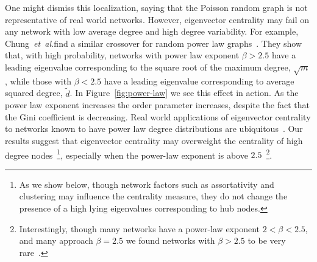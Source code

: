 \documentclass[twocolumn,prl,superscriptaddress]{revtex4}
\newcommand{\etal}{{\it{}et~al.}}
\begin{document}
One might dismiss this localization, saying that the Poisson random graph is not representative of real world networks. However, eigenvector centrality may fail on any network with low average degree and high degree variability. For example, Chung~\etal find a similar crossover for random power law graphs~\cite{chung03}. They show that, with high probability, networks with power law exponent $\beta > 2.5$ have a leading eigenvalue corresponding to the square root of the maximum degree, $\sqrt{m}$, while those with $\beta < 2.5$ have a leading eigenvalue corresponding to average squared degree, $\tilde{d}$. In Figure~\ref{fig:power-law} we see this effect in action. As the power law exponent increases the order parameter increases, despite the fact that the Gini coefficient is decreasing. %
Real world applications of eigenvector centrality to networks known to have power law degree distributions are ubiquitous~\cite{canright06,page99}. Our results suggest that eigenvector centrality may overweight the centrality of high degree nodes~\footnote{As we show below, though network factors such as assortativity and clustering may influence the centrality measure, they do not change the presence of a high lying eigenvalues corresponding to hub nodes.}, especially when the power-law exponent is above $2.5$~\footnote{Interestingly, though many networks have a power-law exponent $2 < \beta < 2.5$, and many approach $\beta = 2.5$ we found networks with $\beta > 2.5$ to be very rare~\cite{newman03}.}.
\end{document}
